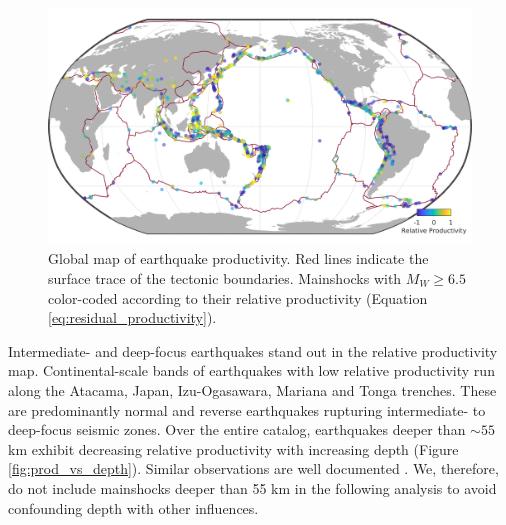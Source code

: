 \documentclass[draft]{agujournal2018}
\begin{document}
    \begin{figure}
    \includegraphics{figures/worldmap_res.png}
        \caption{Global map of earthquake productivity. Red lines indicate the surface trace of the tectonic boundaries. Mainshocks with $M_W\ge6.5$ color-coded according to their relative productivity (Equation \ref{eq:residual_productivity}).
        } 
        \label{fig:global_res}
    \end{figure}

    Intermediate- and deep-focus earthquakes stand out in the relative productivity map. Continental-scale bands of earthquakes with low relative productivity run along the Atacama, Japan, Izu-Ogasawara, Mariana and Tonga trenches. These are predominantly normal and reverse earthquakes rupturing intermediate- to deep-focus seismic zones. Over the entire catalog, earthquakes deeper than $\sim55$ km exhibit decreasing relative productivity with increasing depth (Figure \ref{fig:prod_vs_depth}). Similar observations are well documented \citep{Bath1965LateralMantle, Frohlich1989TheEarthquakes, Nyffenegger2000, Wiens1997AftershockZone, Wu1999, Houston2004}. We, therefore, do not include mainshocks deeper than 55 km  in the following analysis to avoid confounding depth with other influences.
    
\end{document}
